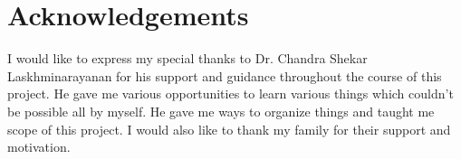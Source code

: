 \chapter*{\centering Acknowledgements}
\quad I would like to express my special thanks to Dr. Chandra Shekar Laskhminarayanan for his support and guidance throughout the course of this project. He gave me various opportunities to learn various things which couldn't be possible all by myself. He gave me ways to organize things and taught me scope of this project. I would also like to thank my family for their support and motivation.
